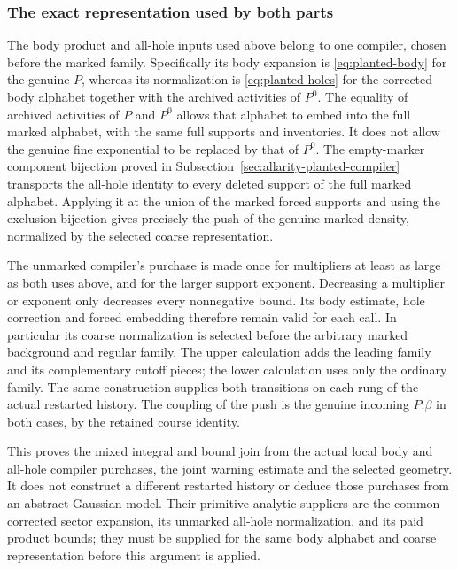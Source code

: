 \subsubsection{The exact representation used by both parts}

The body product and all-hole inputs used above belong to one compiler,
chosen before the marked family. Specifically its body expansion is
\eqref{eq:planted-body} for the genuine $P$, whereas its normalization
is \eqref{eq:planted-holes} for the corrected body alphabet together
with the archived activities of $P^0$. The equality of archived
activities of $P$ and $P^0$ allows that alphabet to embed into the
full marked alphabet, with the same full supports and inventories.
It does not allow the genuine fine exponential to be replaced by that
of $P^0$. The empty-marker component bijection proved in
Subsection~\ref{sec:allarity-planted-compiler} transports the all-hole
identity to every deleted support of the full marked alphabet.
Applying it at the union of the marked forced supports and using the
exclusion bijection gives precisely the push of the genuine marked
density, normalized by the selected coarse representation.

The unmarked compiler's purchase is made once for multipliers at least
as large as both uses above, and for the larger support exponent.
Decreasing a multiplier or exponent only decreases every nonnegative
bound. Its body estimate, hole correction and forced embedding therefore
remain valid for each call. In particular its coarse normalization is
selected before the arbitrary marked background and regular family.
The upper calculation adds the leading family and its complementary
cutoff pieces; the lower calculation uses only the ordinary family.
The same construction supplies both transitions on each rung of the
actual restarted history. The coupling of the push is the genuine
incoming $P.\beta$ in both cases, by the retained course identity.

This proves the mixed integral and bound join from the actual local
body and all-hole compiler purchases, the joint warning estimate and
the selected geometry. It does not construct a different restarted
history or deduce those purchases from an abstract Gaussian model.
Their primitive analytic suppliers are the common corrected sector
expansion, its unmarked all-hole normalization, and its paid product
bounds; they must be supplied for the same body alphabet and coarse
representation before this argument is applied.
